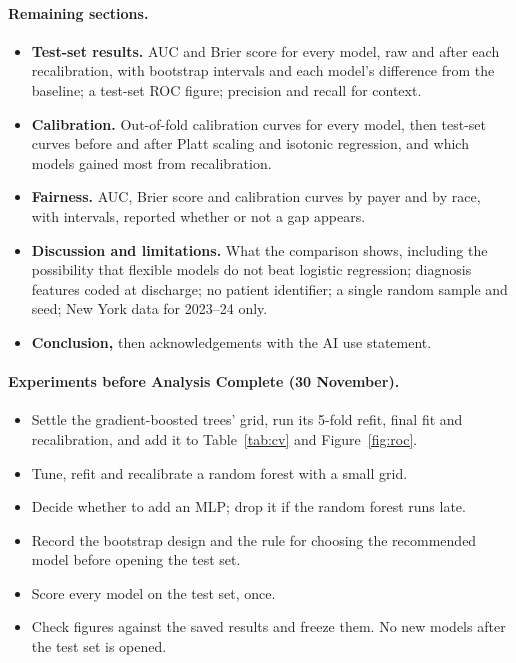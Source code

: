 \documentclass{article}
\begin{document}
\paragraph{Remaining sections.}
\begin{itemize}
  \item \textbf{Test-set results.} AUC and Brier score for every model, raw and
        after each recalibration, with bootstrap intervals and each model's
        difference from the baseline; a test-set ROC figure; precision and
        recall for context.
  \item \textbf{Calibration.} Out-of-fold calibration curves for every model,
        then test-set curves before and after Platt scaling and isotonic
        regression, and which models gained most from recalibration.
  \item \textbf{Fairness.} AUC, Brier score and calibration curves by payer and
        by race, with intervals, reported whether or not a gap appears.
  \item \textbf{Discussion and limitations.} What the comparison shows, including
        the possibility that flexible models do not beat logistic regression;
        diagnosis features coded at discharge; no patient identifier; a single
        random sample and seed; New York data for 2023--24 only.
  \item \textbf{Conclusion,} then acknowledgements with the AI use statement.
\end{itemize}

\paragraph{Experiments before Analysis Complete (30 November).}
\begin{itemize}
  \item Settle the gradient-boosted trees' grid, run its 5-fold
        refit, final fit and recalibration, and add it to
        Table~\ref{tab:cv} and Figure~\ref{fig:roc}.
  \item Tune, refit and recalibrate a random forest with a small
        grid.
  \item Decide whether to add an MLP; drop it if the random forest
        runs late.
  \item Record the bootstrap design and the rule for choosing the
        recommended model before opening the test set.
  \item Score every model on the test set, once.
  \item Check figures against the saved results and freeze
        them. No new models after the test set is opened.
\end{itemize}
\end{document}
